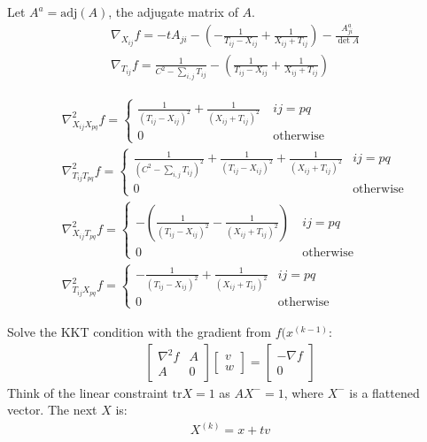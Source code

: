 \documentclass{article}
\theoremstyle{remark}
\theoremstyle{definition}
\def\tr{\mathrm{tr}}
\begin{document}
{
\color{blue}
Let $A^a=\mathrm{adj}(A)$, the adjugate matrix of $A$.
\begin{align*}
    &\nabla_{X_{ij}} f = -tA_{ji} - (-\frac{1}{T_{ij}-X_{ij}}+\frac{1}{X_{ij}+T_{ij}})-\frac{A^a_{ji}}{\det A} \\
    &\nabla_{T_{ij}} f = \frac{1}{C^2-\sum_{i,j}T_{ij}} - (\frac{1}{T_{ij}-X_{ij}}+\frac{1}{X_{ij}+T_{ij}})
\end{align*}

\begin{align*}
    &\nabla^2_{X_{ij}X_{pq}}f=
    \begin{cases}
    \frac{1}{(T_{ij}-X_{ij})^2}+\frac{1}{(X_{ij}+T_{ij})^2} ~ & ij=pq \\
    0 & \text{otherwise}
    \end{cases} \\
    &\nabla^2_{T_{ij}T_{pq}}f=
    \begin{cases}
    \frac{1}{(C^2-\sum_{i,j}T_{ij})^2}+\frac{1}{(T_{ij}-X_{ij})^2} + \frac{1}{(X_{ij}+T_{ij})^2} & ij=pq \\
    0 & \text{otherwise}
    \end{cases} \\
    &\nabla^2_{X_{ij}T_{pq}}f=
    \begin{cases}
    -(\frac{1}{(T_{ij}-X_{ij})^2}-\frac{1}{(X_{ij}+T_{ij})^2}) ~ & ij=pq \\
    0 & \text{otherwise}
    \end{cases} \\
    &\nabla^2_{T_{ij}X_{pq}}f=
    \begin{cases}
    -\frac{1}{(T_{ij}-X_{ij})^2} + \frac{1}{(X_{ij}+T_{ij})^2} & ij=pq \\
    0 & \text{otherwise}
    \end{cases}
\end{align*}

Solve the KKT condition with the gradient from $f(x^{(k-1)}$:
\begin{align*}
    \begin{bmatrix}
    \nabla^2 f & A \\
    A & 0
    \end{bmatrix}
    \begin{bmatrix}
    v\\
    w
    \end{bmatrix}
    =\begin{bmatrix}
    -\nabla f \\
     0
    \end{bmatrix}
\end{align*}
Think of the linear constraint $\tr X=1$ as $AX^-=1$, where $X^-$ is a flattened vector.
The next $X$ is:
\begin{align*}
    X^{(k)}=x + tv
\end{align*}
}
\bigskip
\noindent
\end{document}
